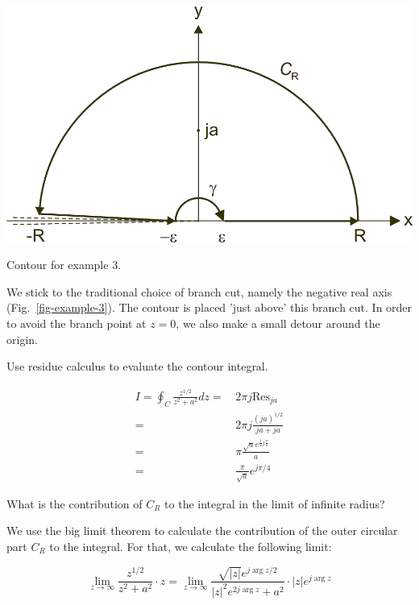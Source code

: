 \begin{marginfigure}[-0cm]
\centering
\includegraphics{complex/figures/int_ex_3}
\caption{Contour for example 3.}
\label{fig-example-3}
\end{marginfigure}

We stick to the traditional choice of branch cut, namely the negative real axis (Fig.~\ref{fig-example-3}). The contour is placed 'just above' this branch cut. In order to avoid the branch point at $z=0$, we also make a small detour around the origin.

\begin{cue}
Use residue calculus to evaluate the contour integral.
\end{cue}

\begin{align}
I = \oint_{{C}} \frac{z^{1/2}}{z^2+a^2} dz =& \, 2 \pi j \textrm{Res}_{j a}
\nonumber \\
=& \, 2 \pi j \frac{(j a)^{1/2}}{ja + ja} \nonumber \\
=& \, \pi \frac{\sqrt{a}e^{\frac{1}{2}j\frac{\pi}{2}}}{a} \nonumber \\
=& \, \frac{\pi}{\sqrt{a}} e^{j \pi /4}
\end{align}

\begin{cue}
What is the contribution of ${C_R}$ to the integral in the limit of infinite radius?
\end{cue}

We use the big limit theorem to calculate the contribution of the outer circular part ${C_R}$ to the integral. For that, we calculate the following limit:

\begin{equation}
\lim_{z \to \infty}\frac{z^{1/2}}{z^2+a^2} \cdot z = \lim_{z \to
\infty}\frac{\sqrt{|z|}e^{j \arg z / 2}}{|z|^2 e^{2 j \arg z}+a^2} \cdot |z|
e^{j \arg z}
\end{equation}

